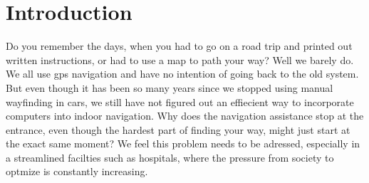 \chapter{Introduction}

Do you remember the days, when you had to go on a road trip and printed out written instructions, or had to use a map to path your way? Well we barely do. We all use gps navigation and have no intention of going back to the old system. But even though it has been so many years since we stopped using manual wayfinding in cars, we still have not figured out an effiecient way to incorporate computers into indoor navigation. Why does the navigation assistance stop at the entrance, even though the hardest part of finding your way, might just start at the exact same moment? We feel this problem needs to be adressed, especially in a streamlined facilties such as hospitals, where the pressure from society to optmize is constantly increasing.




